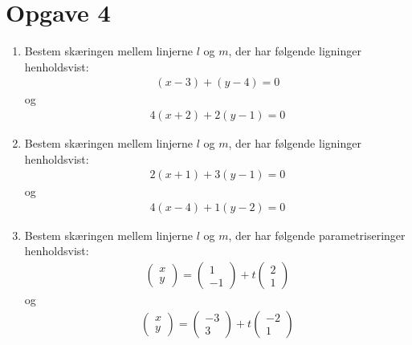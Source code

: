 \section*{Opgave 4}
\begin{enumerate}[label=\roman*)]
\item Bestem skæringen mellem linjerne $l$ og $m$, der har følgende ligninger henholdsvist:
\begin{align*}
(x-3) + (y-4) = 0
\end{align*}
og 
\begin{align*}
4(x+2) + 2(y-1) = 0
\end{align*}

\item Bestem skæringen mellem linjerne $l$ og $m$, der har følgende ligninger henholdsvist:
\begin{align*}
2(x+1) + 3(y-1) = 0
\end{align*}
og 
\begin{align*}
4(x-4) + 1(y-2) = 0
\end{align*}

\item Bestem skæringen mellem linjerne $l$ og $m$, der har følgende parametriseringer henholdsvist:
\begin{align*}
\begin{pmatrix}
x \\ y
\end{pmatrix}
= 
\begin{pmatrix}
1 \\ -1
\end{pmatrix}
+
t
\begin{pmatrix}
2 \\ 1
\end{pmatrix}
\end{align*}
og 
\begin{align*}
\begin{pmatrix}
x \\ y
\end{pmatrix}
= 
\begin{pmatrix}
-3 \\ 3
\end{pmatrix}
+
t
\begin{pmatrix}
-2 \\ 1
\end{pmatrix}
\end{align*}


\end{enumerate}
